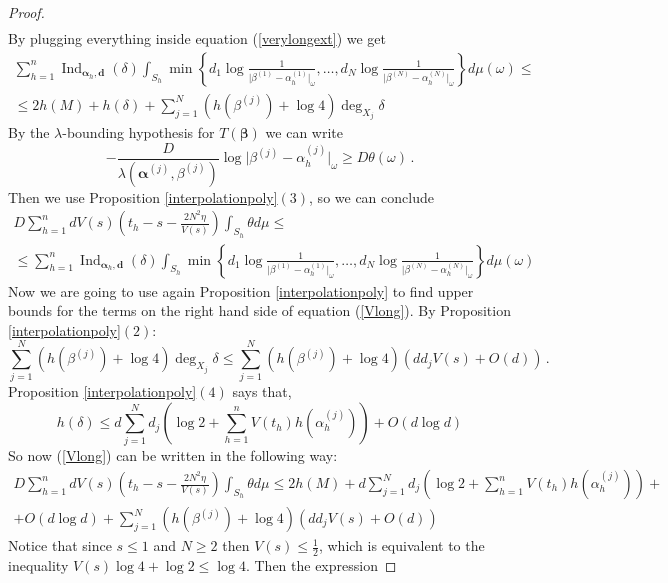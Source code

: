 \documentclass[10 pt,a4paper]{article}
\theoremstyle{plain}
\theoremstyle{definition}
\theoremstyle{named}
\DeclareMathOperator{\Ind}{Ind}
\begin{document}
\begin{proof}
\begin{multline*}
\end{multline*}
By plugging everything inside equation (\ref{verylongext}) we get
\begin{multline}\label{Vlong}
\sum^n_{h=1}\Ind_{\bm{\alpha}_h, \bm{d}} (\delta)\int_{ S_h}\min\left\{d_1\log\frac{1}{\vert\beta^{(1)}- \alpha_{h}^{(1)}\vert_\omega},\ldots, d_N\log\frac{1}{\vert\beta^{(N)}- \alpha_{h}^{(N)}\vert_\omega}\right\}d\mu(\omega)\leq \\
\leq 2h(M)+h(\delta)+\sum_{j=1}^{N}\left(h(\beta^{(j)})+\log 4\right)\deg_{X_j}\!\!\delta
\end{multline}
By the $\lambda$-bounding hypothesis for $T(\bm{\beta})$ 
we can write 
$$
-\frac{D}{{\lambda(\bm{\alpha}^{(j)},\beta^{(j)})}}\log\vert\beta^{(j)}- \alpha_{h}^{(j)}\vert_\omega \ge D\theta(\omega)\,. 
$$
Then we use Proposition \ref{interpolationpoly}$(3)$, so we can conclude 
\begin{multline}\label{sinistro}
D\sum_{h=1}^{n}dV(s)\left(t_h-s-\frac{2N^2\eta}{V(s)} \right)\int_{S_h}\theta d\mu\le\\
\leq\sum^n_{h=1}\Ind_{\bm{\alpha}_h, \bm{d}} (\delta)\int_{S_h}\min\left\{d_1\log\frac{1}{\vert\beta^{(1)}- \alpha_{h}^{(1)}\vert_\omega},\ldots, d_N\log\frac{1}{\vert\beta^{(N)}- \alpha_{h}^{(N)}\vert_\omega}\right\}d\mu(\omega)
\end{multline}
Now we are going to use again Proposition \ref{interpolationpoly}  to find upper bounds for the terms on the right hand side of equation (\ref{Vlong}). By Proposition \ref{interpolationpoly}$(2)$:
 \begin{equation}\label{destro}
 \sum_{j=1}^{N}\left(h(\beta^{(j)})+\log 4\right)\deg_{X_j}\!\!\delta\leq \sum_{j=1}^{N}\left( h(\beta^{(j)})+\log 4\right)(dd_jV(s)+O(d))\,.
 \end{equation}
Proposition \ref{interpolationpoly}$(4)$ says that,
\begin{equation}
h(\delta)\leq d\sum_{j=1}^{N}d_j\left(\log 2+ \sum_{h=1}^{n}V(t_h)h(\alpha^{(j)}_{h})\right)+O(d\log d)
\end{equation}
So now (\ref{Vlong}) can be written in the following way:
 \begin{multline}\label{thefinal}
 D\sum_{h=1}^{n}dV(s)\left(t_h-s-\frac{2N^2\eta}{V(s)} \right)\int_{ S_h}\theta d\mu\leq 2h(M)+d\sum_{j=1}^{N}d_j\left(\log 2+ \sum_{h=1}^{n}V(t_h)h(\alpha^{(j)}_{h})\right)+ \\
 +O(d\log d)+\sum_{j=1}^{N}\left( h(\beta^{(j)})+\log 4\right)(dd_jV(s)+O(d))
\end{multline}
Notice that since $s\le 1$ and $N\ge 2$ then $V(s)\le\frac{1}{2}$, which is equivalent to the inequality $V(s)\log 4+\log 2\leq \log 4$. Then the expression

\end{proof}
\end{document}
